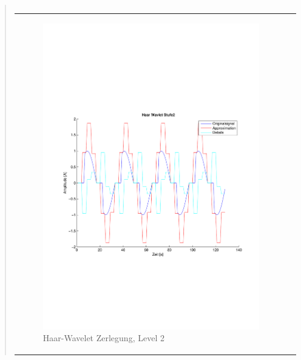 \begin{quote}
\begin{center}
\begin{tabular}{ll}
                \end{tabular}
                \end{center}
                
       
        \begin{center}
                \begin{tabular}{ll}
    
                \hspace{-8em}
                    \begin{minipage}{0.6\textwidth}
    
                        \begin{figure}[H]
                            \label{fig:}
                            \includegraphics[scale=0.4, trim = 2cm 6cm 1cm
                            7.5cm,
                            clip]{./Bilder/Termin8/Haar_Wavlet_lvl_2}
                            \caption{Haar-Wavelet Zerlegung, Level 2}
                        \end{figure}
    

\end{minipage}
\end{tabular}
\end{center}
\end{quote}

